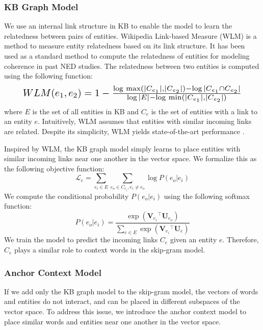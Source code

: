\documentclass[11pt,letterpaper]{article}
\begin{document}
\subsubsection{KB Graph Model}

We use an internal link structure in KB to enable the model to learn the relatedness between pairs of entities.
Wikipedia Link-based Measure (WLM) \cite{DavidMilne} is a method to measure entity relatedness based on its link structure.
It has been used as a standard method to compute the relatedness of entities for modeling coherence in past NED studies.
The relatedness between two entities is computed using the following function:
\begin{equation}
\resizebox{.89\hsize}{!}{$
WLM(e_1, e_2) = 1 - \frac{\log\,\max(|C_{e_1}|, |C_{e_2}|) - \log|C_{e_1} \cap C_{e_2}|}{\log|E| - \log\,\min(|C_{e_1}|, |C_{e_2}|)}
$}
\label{wlm}
\end{equation}
where $E$ is the set of all entities in KB and $C_e$ is the set of entities with a link to an entity $e$.
Intuitively, WLM assumes that entities with similar incoming links are related.
Despite its simplicity, WLM yields state-of-the-art performance \cite{Hoffart2012}.

Inspired by WLM, the KB graph model simply learns to place entities with similar incoming links near one another in the vector space.
We formalize this as the following objective function:
\begin{equation}
\mathcal{L}_e = \sum_{e_i \in E}\sum_{e_o \in C_{e_i}, e_i \neq e_o}\log P(e_o|e_i)
\label{objective_entity_rel}
\end{equation}
We compute the conditional probability $P(e_o|e_i)$ using the following softmax function:
\begin{equation}
P(e_o|e_i) = \frac{\exp(\mathbf{V}_{e_i}\!^\top \mathbf{U}_{e_o})}{\sum_{e \in E}\exp(\mathbf{V}_{e_i}\!^\top \mathbf{U}_e)}
\label{softmax_entity_rel}
\end{equation}
We train the model to predict the incoming links $C_{e}$ given an entity $e$.
Therefore, $C_{e}$ plays a similar role to context words in the skip-gram model.

\subsubsection{Anchor Context Model}

If we add only the KB graph model to the skip-gram model, the vectors of words and entities do not interact, and can be placed in different subspaces of the vector space.
To address this issue, we introduce the anchor context model to place similar words and entities near one another in the vector space.
\end{document}
